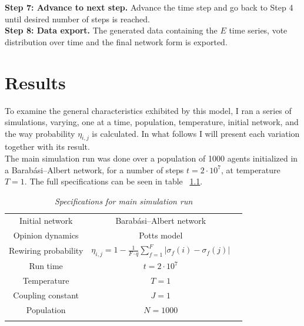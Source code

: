 \documentclass[12pt,openright,twoside]{book}
\begin{document}
\textbf{Step 7: Advance to next step.} Advance the time step and go back to Step 4 until desired number of steps is reached.\\

\textbf{Step 8: Data export.} The generated data containing the $E$ time series, vote distribution over time and the final network form is exported.\\  


\chapter{Results}

To examine the general characteristics exhibited by this model, I ran a series of simulations, varying, one at a time, population, temperature, initial network, and the way probability $\eta_{i,j}$ is calculated. In what follows I will present each variation together with its result.\\

The main simulation run was done over a population of 1000 agents initialized in a Barabási–Albert network, for a number of steps $t=2\cdot 10^7$, at temperature $T=1$. The full specifications can be seen in table ~\ref{final-model-specs}.\\

\begin{table}[!ht]
\centering
\begin{small}
\caption{\textit{Specifications for main simulation run}}
\begin{tabular}{ccc}
\hline
Initial network             & Barabási–Albert network\\
Opinion dynamics            & Potts model \\
Rewiring probability        & $\eta_{i,j}=1-\frac{1}{F\cdot q}\sum_{f=1}^{F}|\sigma_f(i)-\sigma_f(j)|$\\
Run time                    & $t=2\cdot 10^7$\\
Temperature                 & $T=1$ \\
Coupling constant           & $J=1$ \\
Population                  & $N=1000$\\
\hline
\label{final-model-specs}
\end{tabular}
\end{small}
\end{table}
\end{document}
